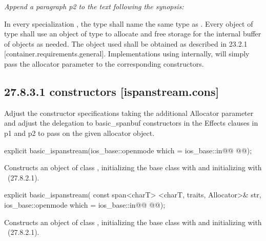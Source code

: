 \documentclass[ebook,11pt,article]{memoir}
\begin{document}
\textit{Append a paragraph p2 to the text following the synopsis:}

\begin{insrt}
\pnum
In every specialization , the type  shall name the same type as . Every object of type  shall use an object of type  to allocate and free storage for the internal buffer of  objects as needed. The  object used shall be obtained as described in 23.2.1 [container.requirements.general].
\enternote
Implementations using  internally, will simply pass the allocator parameter to the corresponding  constructors.
\exitnote
\end{insrt}

\subsection{27.8.3.1  constructors [ispanstream.cons]}
Adjust the constructor specifications taking the additional Allocator parameter and adjust the delegation to basic_spanbuf constructors in the Effects clauses in p1 and p2 to pass on the given allocator object.

\begin{itemdecl}
explicit basic_ispanstream(ios_base::openmode which = ios_base::in@\ins{,}@
  @@);
\end{itemdecl}
\begin{itemdescr}
\pnum
\effects
Constructs an object of class
,
initializing the base class with
and initializing  with
~({27.8.2.1}).
\end{itemdescr}

\begin{itemdecl}
explicit basic_ispanstream(
  const span<charT> <charT, traits, Allocator>& str,
  ios_base::openmode which = ios_base::in@\ins{,}@
  @@);
\end{itemdecl}

\begin{itemdescr}
\pnum
\effects
Constructs an object of class
,
initializing the base class with
and initializing  with
~({27.8.2.1}).
\end{itemdescr}
\end{document}
